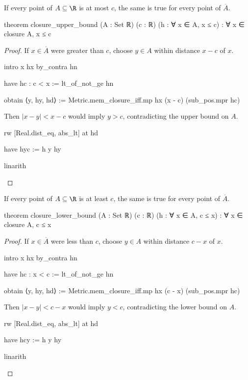 \begin{lemma}
  \label{ma:lem:closure-upper-bound}
  If every point of $A\subseteq\R$ is at most $c$, the same is true for every point of $\overline
    A$.

  \begin{lean}
    theorem closure_upper_bound (A : Set ℝ) (c : ℝ) (h : ∀ x ∈ A, x ≤ c) :
        ∀ x ∈ closure A, x ≤ c
  \end{lean}
\end{lemma}

\begin{proof}
  If $x\in\overline A$ were greater than $c$, choose $y\in A$ within distance $x-c$ of $x$.

  \begin{lean}
    intro x hx
    by_contra hn

    have hc : c < x := lt_of_not_ge hn

    obtain ⟨y, hy, hd⟩ := Metric.mem_closure_iff.mp hx (x - c) (sub_pos.mpr hc)
  \end{lean}

  Then $|x-y|<x-c$ would imply $y>c$, contradicting the upper bound on $A$.

  \begin{lean}
    rw [Real.dist_eq, abs_lt] at hd

    have hyc := h y hy

    linarith
  \end{lean}
\end{proof}

\begin{lemma}
  \label{ma:lem:closure-lower-bound}
  If every point of $A\subseteq\R$ is at least $c$, the same is true for every point of $\overline
    A$.

  \begin{lean}
    theorem closure_lower_bound (A : Set ℝ) (c : ℝ) (h : ∀ x ∈ A, c ≤ x) :
        ∀ x ∈ closure A, c ≤ x
  \end{lean}
\end{lemma}

\begin{proof}
  If $x\in\overline A$ were less than $c$, choose $y\in A$ within distance $c-x$ of $x$.

  \begin{lean}
    intro x hx
    by_contra hn

    have hc : x < c := lt_of_not_ge hn

    obtain ⟨y, hy, hd⟩ := Metric.mem_closure_iff.mp hx (c - x) (sub_pos.mpr hc)
  \end{lean}

  Then $|x-y|<c-x$ would imply $y<c$, contradicting the lower bound on $A$.

  \begin{lean}
    rw [Real.dist_eq, abs_lt] at hd

    have hcy := h y hy

    linarith
  \end{lean}
\end{proof}

